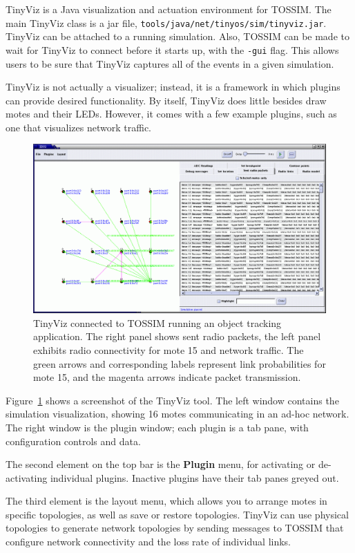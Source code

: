 \documentclass[10pt,fleqn]{article}
\def\sim{TOSSIM\xspace}
\def\tinyviz{TinyViz\xspace}
\def\mote{mote\xspace}
\def\motes{motes\xspace}
\begin{document}
\tinyviz is a Java visualization and actuation environment for
\sim. The main \tinyviz class is a jar file,
{\tt tools/java/net/tinyos/sim/tinyviz.jar}. \tinyviz can be attached
to a running simulation. Also, \sim can be made to wait for \tinyviz
to connect before it starts up, with the {\tt -gui} flag. This allows
users to be sure that \tinyviz captures all of the events in a given
simulation.

\tinyviz is not actually a visualizer; instead, it is a framework in
which plugins can provide desired functionality. By itself, \tinyviz
does little besides draw motes and their LEDs. However, it comes with
a few example plugins, such as one that visualizes network traffic.

\begin{figure}
\centering
\includegraphics[width=6.5in]{fig/tinyviz.png}
\caption{\tinyviz connected to \sim running an object tracking
application. The right panel shows sent radio packets, the left panel
exhibits radio connectivity for \mote 15 and network traffic. The
green arrows and corresponding labels represent link probabilities for
\mote 15, and the magenta arrows indicate packet transmission.}
\label{fig:tinyviz}
\end{figure}

Figure~\ref{fig:tinyviz} shows a screenshot of the \tinyviz tool. The
left window contains the simulation visualization, showing 16 \motes
communicating in an ad-hoc network. The right window is the plugin
window; each plugin is a tab pane, with configuration controls and
data.

The second element on the top bar is the {\bf Plugin} menu, for
activating or de-activating individual plugins. Inactive plugins have
their tab panes greyed out.

The third element is the layout menu, which allows you to arrange
motes in specific topologies, as well as save or restore
topologies. \tinyviz can use physical topologies to generate network
topologies by sending messages to \sim that configure network
connectivity and the loss rate of individual links.
\end{document}
